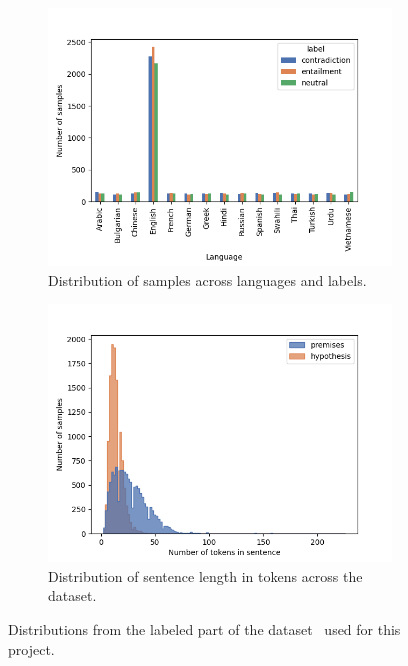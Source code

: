\documentclass[acmsmall,nonacm]{acmart}
\begin{document}
\begin{figure}[!h]
  \begin{subfigure}[b]{0.48\textwidth}
    \includegraphics[width=\textwidth]{assets/label_hist.png}
    \caption{Distribution of samples across languages and labels.}
    \label{fig:languages_lables}
  \end{subfigure}
  \hfill
  \begin{subfigure}[b]{0.48\textwidth}
    \includegraphics[width=\textwidth]{assets/length_hist.png}
    \caption{Distribution of sentence length in tokens across the dataset.}
    \label{fig:sentence_length}
  \end{subfigure}
  \caption{Distributions from the labeled part of the dataset~\cite{kaggle-dataset} used for this project.}
  \label{fig:dataset}
\end{figure}
\end{document}
